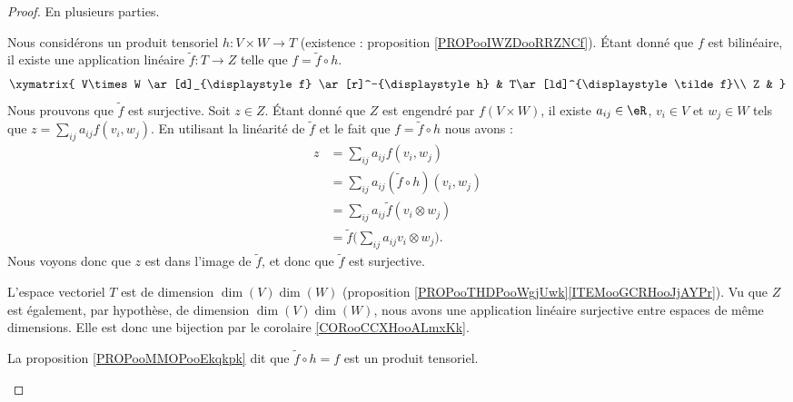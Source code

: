 \begin{proof}
	En plusieurs parties.
	\begin{subproof}
		Nous considérons un produit tensoriel \(h \colon V\times W\to T  \) (existence : proposition \ref{PROPooIWZDooRRZNCf}). Étant donné que \( f\) est bilinéaire, il existe une application linéaire \(\tilde f \colon T\to Z  \) telle que \(f= \tilde f\circ h\).
		\begin{equation}
			\xymatrix{ V\times W  \ar[d]_{\displaystyle f} \ar[r]^-{\displaystyle h} & T\ar[ld]^{\displaystyle \tilde f}\\
			Z & }
		\end{equation}
		Nous prouvons que \( \tilde f\) est surjective. Soit \( z\in Z\). Étant donné que \( Z\) est engendré par \( f(V\times W)\), il existe \( a_{ij}\in \eR\), \( v_i\in V\) et \( w_j\in W\) tels que \( z=\sum_{ij}a_{ij}f(v_i,w_j)\). En utilisant la linéarité de \( \tilde f\) et le fait que \( f=\tilde f\circ h\) nous avons :
		\begin{subequations}
			\begin{align}
				z & = \sum_{ij}a_{ij}f(v_i,w_j)                         \\
				  & =\sum_{ij}a_{ij}(\tilde f\circ h)(v_i,w_j)          \\
				  & =\sum_{ij}a_{ij}\tilde f(v_i\otimes w_j)            \\
				  & =\tilde f\big( \sum_{ij}a_{ij}v_i\otimes w_j \big).
			\end{align}
		\end{subequations}
		Nous voyons donc que \( z\) est dans l'image de \( \tilde f\), et donc que \( \tilde f\) est surjective.

		L'espace vectoriel \( T\) est de dimension \( \dim(V)\dim(W)\) (proposition \ref{PROPooTHDPooWgjUwk}\ref{ITEMooGCRHooJjAYPr}). Vu que \( Z\) est également, par hypothèse, de dimension \( \dim(V)\dim(W)\), nous avons une application linéaire surjective entre espaces de même dimensions. Elle est donc une bijection par le corolaire \ref{CORooCCXHooALmxKk}.

		\spitem[Conclusion]
		La proposition \ref{PROPooMMOPooEkqkpk} dit que \( \tilde f\circ h=f\) est un produit tensoriel.
	\end{subproof}
\end{proof}

